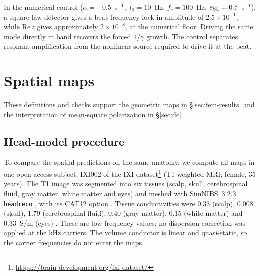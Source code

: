 \documentclass[11pt,a4paper]{article}
\newif\ifjne
\begin{document}
In the numerical control ($\alpha=-0.5$~s$^{-1}$, $f_0=10$~Hz, $f_c=100$~Hz,
$\varepsilon_{\rm SL}=0.5$~s$^{-1}$), a square-law detector gives a beat-frequency lock-in amplitude
of $2.5\times10^{-1}$, while $\mathrm{Re}\,z$ gives approximately
$2\times10^{-8}$, at the numerical floor. Driving the same mode directly in band
recovers the forced $1/\gamma$ growth. The control separates resonant amplification
from the nonlinear source required to drive it at the beat.

\section{Spatial maps}\label{supp:spatial}
These definitions and checks support the geometric maps in \S\ref{sec:fem-results}
and the interpretation of mean-square polarization in \S\ref{sec:dc}.
\ifjne
\subsection{Envelope-mean subharmonicity}\label{supp:envelope-proof}
The envelope mean has the same restriction. At each beat phase $\vartheta$,
$\mathcal A$ is the Euclidean norm of
$(\varepsilon_1+\varepsilon_2\cos\vartheta,\,\varepsilon_2\sin\vartheta)$,
a vector of harmonic functions. A norm is convex, so this envelope is subharmonic;
averaging over $\vartheta$ preserves that property. Thus both idealized mean maps
lack a strict interior maximum under these conditions (Fig.~\ref{fig:spatial_maps}b).

\subsection{Isotropic orientation averages}\label{supp:orientation}
For isotropically distributed unit orientations
$\mathbf n$ with orientation-independent access and curvature,
$\langle(\mathbf n\cdot\mathbf E_j)^2\rangle=|\mathbf E_j|^2/3$
and $\langle(\mathbf n\cdot\mathbf E_1)(\mathbf n\cdot\mathbf E_2)\rangle
=\mathbf E_1\cdot\mathbf E_2/3$: orthogonal fields cancel the averaged beat,
but retain the DC intensity.

\fi
\ifjne
\subsection{Head-model procedure}\label{supp:fem-protocol}
To compare the spatial predictions on the same anatomy, we compute all maps
in one open-access subject,
IXI002 of the IXI dataset\footnote{\url{https://brain-development.org/ixi-dataset/}}
(T1-weighted MRI; female, 35 years). The T1 image was segmented into six tissues
(scalp, skull, cerebrospinal fluid, gray matter, white matter and eyes) and meshed with
SimNIBS~3.2.3 \texttt{headreco} \cite{nielsen2018}, with its CAT12 option
\cite{gaser2024}. Tissue conductivities were 0.33 (scalp), 0.008 (skull), 1.79
(cerebrospinal fluid), 0.40 (gray matter), 0.15 (white matter) and 0.33~S/m (eyes)
\cite{salvador2025}. These are low-frequency values; no dispersion correction was
applied at the kHz carriers. The volume conductor is linear and quasi-static, so the
carrier frequencies do not enter the maps.
\end{document}
